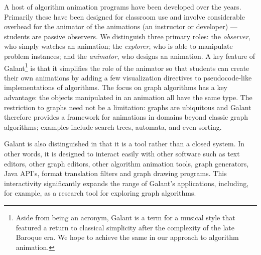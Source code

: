   A host of algorithm animation programs have been developed over the
  years. Primarily these have been designed for classroom use and involve
  considerable overhead for the animator of the animations (an instructor or
  developer) --- students are passive observers.  We distinguish three
  primary roles: the \emph{observer}, who simply watches an animation; the
  \emph{explorer}, who is able to manipulate problem instances; and the
  \emph{animator}, who designs an animation.  A key feature of Galant\footnote{
    Aside from being an acronym, Galant is a term for a musical style
that featured a return to classical simplicity after the complexity of the late Baroque era. We hope to achieve the same in our approach to algorithm animation.
} is that
  it simplifies the role of the animator so that students can create their
  own animations by adding a few visualization directives to pseudocode-like
  implementations of algorithms.  The focus on graph algorithms has a key
  advantage: the objects manipulated in an animation all have the same
  type.
  The restriction to graphs need not be a limitation:
  graphs are ubiquitous and Galant therefore provides a framework for
  animations in domains beyond classic graph algorithms; examples include
  search trees, automata, and even sorting.

  Galant is also distinguished in that it is a tool rather than a closed
  system.  In other words, it is designed to interact easily with other
  software such as text editors, other graph editors, other algorithm
  animation tools, graph generators, Java API's, format translation filters
  and graph drawing programs. This interactivity significantly expands the
  range of Galant's applications, including, for example, as a research tool
  for exploring graph algorithms.
